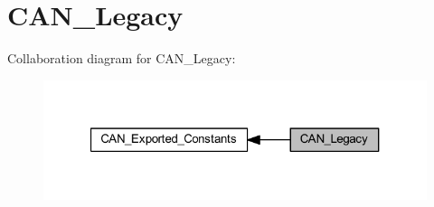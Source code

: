\hypertarget{group___c_a_n___legacy}{}\section{C\+A\+N\+\_\+\+Legacy}
\label{group___c_a_n___legacy}
Collaboration diagram for C\+A\+N\+\_\+\+Legacy\+:
\nopagebreak
\begin{figure}[H]
\begin{center}
\leavevmode
\includegraphics[width=321pt]{group___c_a_n___legacy}
\end{center}
\end{figure}
